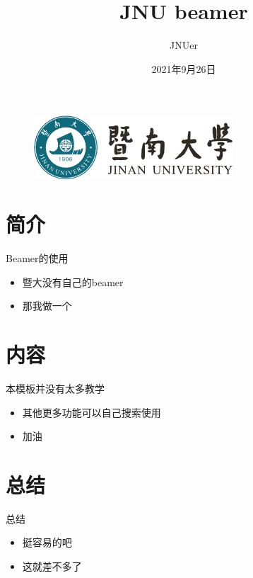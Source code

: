 \documentclass{beamer}
\author{JNUer}
\title{JNU beamer}
\subtitle{}
\institute{}
\date{2021年9月26日}
\begin{document}
\kaishu
\begin{frame}
    \begin{figure}[htpb]
      \begin{center}
            \includegraphics[width=0.4\linewidth]{pic/jnu.png}
             \end{center}
    \end{figure}
     \titlepage
\end{frame}

\begin{frame}
    \tableofcontents[sectionstyle=show,subsectionstyle=show/shaded/hide,subsubsectionstyle=show/shaded/hide]
\end{frame}


\section{简介}

\begin{frame}{Beamer的使用}
    \begin{itemize}
        \item 暨大没有自己的beamer
        \item 那我做一个
    \end{itemize}
\end{frame}

\section{内容}

\begin{frame}{本模板并没有太多教学}
    \begin{itemize}
        \item 其他更多功能可以自己搜索使用
        \item 加油
    \end{itemize}
\end{frame}

\section{总结}

\begin{frame}{总结}
    \begin{itemize}
        \item 挺容易的吧
        \item 这就差不多了
    \end{itemize}
\end{frame}
\end{document}
